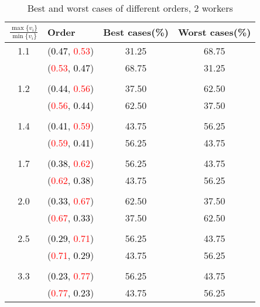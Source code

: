 \documentclass[10pt,a4paper]{report}
\begin{document}
    \begin{center}
	\small
	\begin{longtable}{clcc}
		\caption{Best and worst cases of different orders, 2 workers}\\
		\toprule
		\setlength{\tabcolsep}{1mm}
		\renewcommand\baselinestretch{0.5}\selectfont
		$\frac{\max\{v_i\}}{\min\{v_i\}}$ & Order & Best cases(\%) & Worst cases(\%) \\
			\midrule		1.1			&(\textcolor{black}{0.47}, \textcolor{red}{0.53})&31.25&68.75\\
			&(\textcolor{red}{0.53}, \textcolor{black}{0.47})&68.75&31.25\\
		&&&\\
		1.2			&(\textcolor{black}{0.44}, \textcolor{red}{0.56})&37.50&62.50\\
			&(\textcolor{red}{0.56}, \textcolor{black}{0.44})&62.50&37.50\\
		&&&\\
		1.4			&(\textcolor{black}{0.41}, \textcolor{red}{0.59})&43.75&56.25\\
			&(\textcolor{red}{0.59}, \textcolor{black}{0.41})&56.25&43.75\\
		&&&\\
		1.7			&(\textcolor{black}{0.38}, \textcolor{red}{0.62})&56.25&43.75\\
			&(\textcolor{red}{0.62}, \textcolor{black}{0.38})&43.75&56.25\\
		&&&\\
		2.0			&(\textcolor{black}{0.33}, \textcolor{red}{0.67})&62.50&37.50\\
			&(\textcolor{red}{0.67}, \textcolor{black}{0.33})&37.50&62.50\\
		&&&\\
		2.5			&(\textcolor{black}{0.29}, \textcolor{red}{0.71})&56.25&43.75\\
			&(\textcolor{red}{0.71}, \textcolor{black}{0.29})&43.75&56.25\\
		&&&\\
		3.3			&(\textcolor{black}{0.23}, \textcolor{red}{0.77})&56.25&43.75\\
			&(\textcolor{red}{0.77}, \textcolor{black}{0.23})&43.75&56.25\\
		\bottomrule
	\end{longtable}
\end{center}
\end{document}
